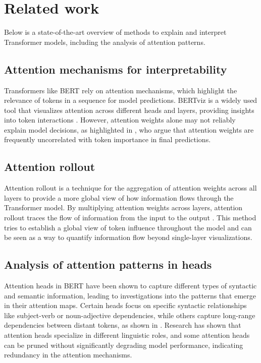 \section{Related work}
Below is a state-of-the-art overview of methods to explain and interpret Transformer models, including the analysis of attention patterns.

\subsection{Attention mechanisms for interpretability}
Transformers like BERT rely on attention mechanisms, which highlight the relevance of tokens in a sequence for model predictions. BERTviz is a widely used tool that visualizes attention across different heads and layers, providing insights into token interactions \cite{vig2019}. However, attention weights alone may not reliably explain model decisions, as highlighted in \cite{jain2019}, who argue that attention weights are frequently uncorrelated with token importance in final predictions.

\subsection{Attention rollout}
Attention rollout is a technique for the aggregation of attention weights across all layers to provide a more global view of how information flows through the Transformer model. 
By multiplying attention weights across layers, attention rollout traces the flow of information from the input to the output \cite{abnar2020}. This method tries to establish a global view of token influence throughout the model and can be seen as a way to quantify information flow beyond single-layer visualizations.

\subsection{Analysis of attention patterns in heads}
Attention heads in BERT have been shown to capture different types of syntactic and semantic information, leading to investigations into the patterns that emerge in their attention maps. Certain heads focus on specific syntactic relationships like subject-verb or noun-adjective dependencies, while others capture long-range dependencies between distant tokens, as shown in \cite{clark2019}. Research has shown that attention heads specialize in different linguistic roles, and some attention heads can be pruned without significantly degrading model performance, indicating redundancy in the attention mechanisms.

